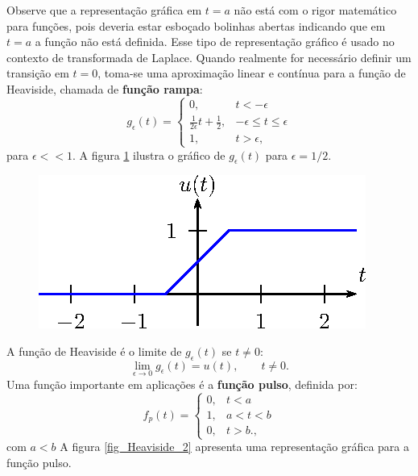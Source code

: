 Observe que a representação gráfica em $t=a$ não está com o rigor matemático para funções, pois deveria estar esboçado bolinhas abertas indicando que em $t=a$ a função não está definida. Esse tipo de representação gráfico é usado no contexto de transformada de Laplace. Quando realmente for necessário definir um transição em $t=0$, toma-se uma aproximação linear e contínua para a função de Heaviside, chamada de {\bf função rampa}:
\begin{equation}
g_\epsilon(t)=\left\{\begin{array}{ll}0,& t<-\epsilon\\ \frac{1}{2\epsilon}t+\frac{1}{2},&-\epsilon\leq t \leq \epsilon\\1,&t>\epsilon, \end{array}\right.
\end{equation}
para $\epsilon<<1$. A figura \ref{fig_Heaviside_1} ilustra o gráfico de $g_\epsilon(t)$ para $\epsilon=1/2$.
\begin{figure}[!ht]
\begin{center}

\includegraphics{cap_trans_int/pics/figura_5}\end{center}
\caption{\label{fig_Heaviside_1}}
\end{figure}
A função de Heaviside é o limite de $g_\epsilon(t)$ se $t\neq 0$:
\begin{equation}
\lim_{\epsilon\to 0}g_\epsilon(t) =u(t),\qquad t\neq 0.
\end{equation}
Uma função importante em aplicações é a {\bf função pulso}, definida por:
\begin{equation}
 f_p(t)=\left\{ \begin{array}{ll} 0, &t<a\\1,&a<t<b\\0,&t>b., \end{array}\right.
\end{equation}
com $a<b$
A figura \ref{fig_Heaviside_2} apresenta uma representação gráfica para a função pulso.
